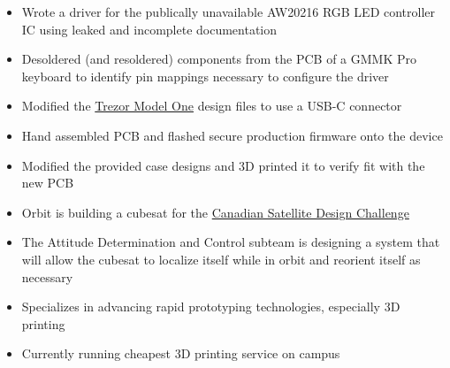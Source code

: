 \documentclass{resume}
\begin{document}
\begin{itemize}
    \item Wrote a driver for the publically unavailable AW20216 RGB LED controller IC using leaked and incomplete documentation
    \item Desoldered (and resoldered) components from the PCB of a GMMK Pro keyboard to identify pin mappings necessary to configure the driver
\end{itemize}

\begin{itemize}
    \item Modified the \href{https://shop.trezor.io/product/trezor-one-white}{Trezor Model One} design files to use a USB-C connector
    \item Hand assembled PCB and flashed secure production firmware onto the device
    \item Modified the provided case designs and 3D printed it to verify fit with the new PCB
\end{itemize}

\StudentTeams

\begin{itemize}
    \item Orbit is building a cubesat for the \href{https://www.csdcms.ca/}{Canadian Satellite Design Challenge}
    \item The Attitude Determination and Control subteam is designing a system that will allow the cubesat to localize itself while in orbit and reorient itself as necessary
\end{itemize}

\begin{itemize}
	\item Specializes in advancing rapid prototyping technologies, especially 3D printing
	\item Currently running cheapest 3D printing service on campus
\end{itemize}

\Education

\end{document}
